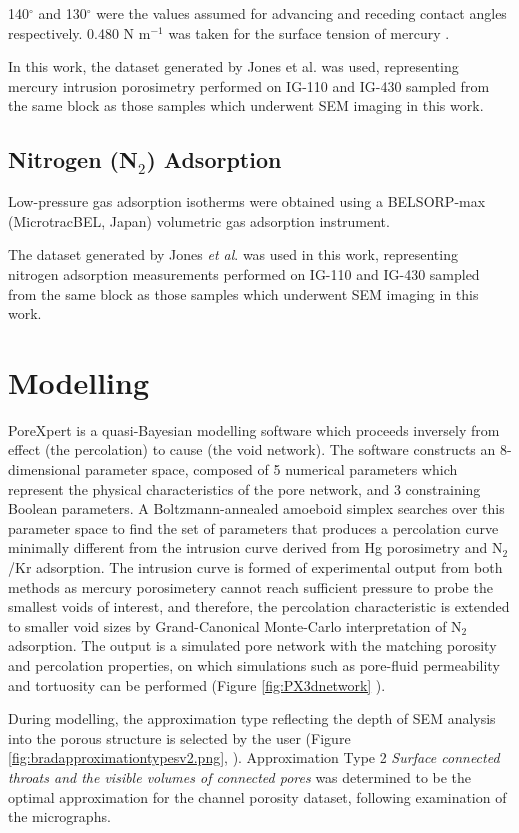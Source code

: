 \documentclass[review]{elsarticle}
\begin{document}
140$^{\circ}$ and 130$^{\circ}$ were the values assumed for advancing and
receding contact angles respectively. 0.480 N m$^{-1}$ was taken for the surface
tension of mercury \citep{VANBRAKEL19811}.  

In this work, the dataset generated by Jones et al. \citep{Jones2018} was used,
representing mercury intrusion porosimetry performed on IG-110 and IG-430
sampled from the same block as those samples which underwent SEM imaging in this work.

\subsection{Nitrogen (N$_2$) Adsorption}
Low-pressure gas adsorption isotherms were obtained using a BELSORP-max (MicrotracBEL, Japan)
volumetric gas adsorption instrument.

The dataset generated by Jones \textit{et al}. \citep{Jones2018} was used in
this work, representing nitrogen adsorption measurements performed on IG-110 and
IG-430 sampled from the same block as those samples which underwent SEM imaging
in this work.

\section{Modelling}

PoreXpert is a quasi-Bayesian modelling software which proceeds inversely from
effect (the percolation) to cause (the void network). The software constructs an
8-dimensional parameter space, composed of 5 numerical parameters which
represent the physical characteristics of the pore network, and 3 constraining
Boolean parameters. A Boltzmann-annealed amoeboid simplex searches over this
parameter space to find the set of parameters that produces a percolation curve
minimally different from the intrusion curve derived from Hg porosimetry and
N$_2$/Kr adsorption. The intrusion curve is formed of experimental output from
both methods as mercury porosimetery cannot reach sufficient pressure to probe
the smallest voids of interest, and therefore, the percolation characteristic is
extended to smaller void sizes by Grand-Canonical Monte-Carlo interpretation of
N$_2$ adsorption. The output is a simulated pore network with the matching
porosity and percolation properties, on which simulations such as pore-fluid
permeability and tortuosity can be performed (Figure \ref{fig:PX3dnetwork}
\citep{MatthewsPoreXpert2025}).

During modelling, the approximation type reflecting the depth of SEM analysis
into the porous structure is selected by the user (Figure
\ref{fig:bradapproximationtypesv2.png}, \citep{MatthewsPoreXpert2025}).
Approximation Type 2 \textit{Surface connected throats and the visible volumes
of connected pores} was determined to be the optimal approximation for the
channel porosity dataset, following examination of the micrographs.
\end{document}
